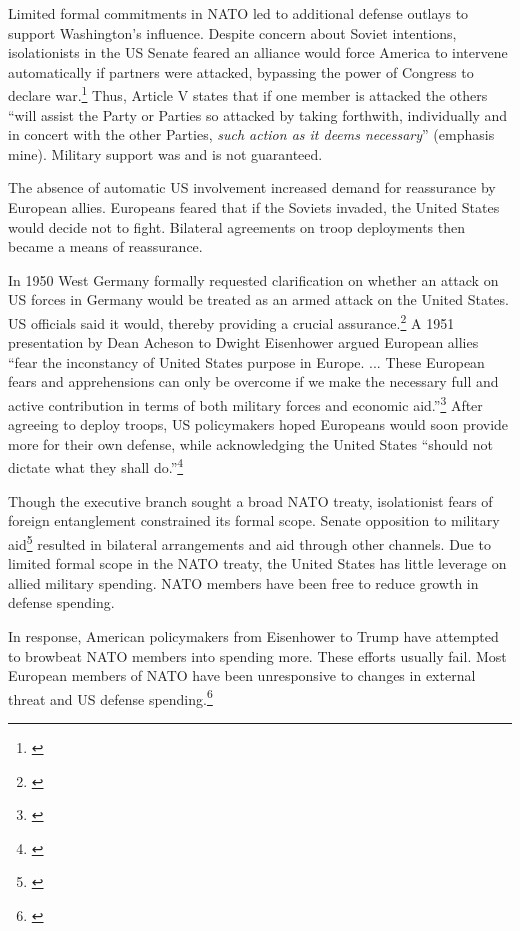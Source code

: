 \documentclass[12pt]{article}
\begin{document}
Limited formal commitments in NATO led to additional defense outlays to support Washington's influence.
Despite concern about Soviet intentions, isolationists in the US Senate feared an alliance would force America to intervene automatically if partners were attacked, bypassing the power of Congress to declare war.\footnote{\citet[pg. 280-1]{Acheson1969}}
Thus, Article V states that if one member is attacked the others ``will assist the Party or Parties so attacked by taking forthwith, individually and in concert with the other Parties, \emph{such action as it deems necessary}'' (emphasis mine). 
Military support was and is not guaranteed. 


The absence of automatic US involvement increased demand for reassurance by European allies. 
Europeans feared that if the Soviets invaded, the United States would decide not to fight. 
Bilateral agreements on troop deployments then became a means of reassurance. 


In 1950 West Germany formally requested clarification on whether an attack on US forces in Germany would be treated as an armed attack on the United States. 
US officials said it would, thereby providing a crucial assurance.\footnote{\citet[pg. 395]{Acheson1969}} 
A 1951 presentation by Dean Acheson to Dwight Eisenhower argued European allies ``fear the inconstancy of United States purpose in Europe. ... These European fears and apprehensions can only be overcome if we make the necessary full and active contribution in terms of both military forces and economic aid.''\footnote{\citet[pg. 3]{Acheson1951}}
After agreeing to deploy troops, US policymakers hoped Europeans would soon provide more for their own defense, while acknowledging the United States ``should not dictate what they shall do.''\footnote{\citet[pg. 2]{Johnson1950}} 


Though the executive branch sought a broad NATO treaty, isolationist fears of foreign entanglement constrained its formal scope. 
Senate opposition to military aid\footnote{\citet[pg 285]{Acheson1969}} resulted in bilateral arrangements and aid through other channels. 
Due to limited formal scope in the NATO treaty, the United States has little leverage on allied military spending. 
NATO members have been free to reduce growth in defense spending. 


In response, American policymakers from Eisenhower to Trump have attempted to browbeat NATO members into spending more. 
These efforts usually fail. 
Most European members of NATO have been unresponsive to changes in external threat and US defense spending.\footnote{\cite{PluemperNeumayer2015}} 
\end{document}
